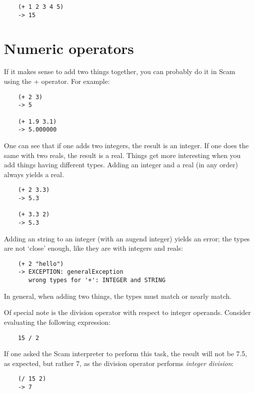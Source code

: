 \begin{verbatim}
    (+ 1 2 3 4 5)
    -> 15
\end{verbatim}

\section{Numeric operators}

If it makes sense to add two things together, you can probably do it in
Scam using the + operator. For example:

\begin{verbatim}
    (+ 2 3)
    -> 5
    
    (+ 1.9 3.1)
    -> 5.000000
\end{verbatim}
    
One can see that if one adds two integers, the result is an integer. If
one does the same with two reals, the result is a real.
Things get more interesting when
you add things having different types. Adding an integer and a real (in
any order) always yields a real.

\begin{verbatim}
    (+ 2 3.3)
    -> 5.3
    
    (+ 3.3 2)
    -> 5.3
\end{verbatim}
    
Adding an string to an integer
(with an augend integer) yields an error;
the types are not `close' enough, like they are with
integers and reals:

\begin{verbatim}
    (+ 2 "hello")
    -> EXCEPTION: generalException
       wrong types for '+': INTEGER and STRING
\end{verbatim}

In general, when adding two things,
the types must match or nearly match.
    
Of special note is the division operator with respect to integer
operands. Consider evaluating the following expression:

\begin{verbatim}
    15 / 2
\end{verbatim}

If one asked the Scam interpreter to perform this task, the result
will not be 7.5, as expected, but rather 7, as the division operator
performs {\it integer division}:

\begin{verbatim}
    (/ 15 2)
    -> 7
\end{verbatim}

